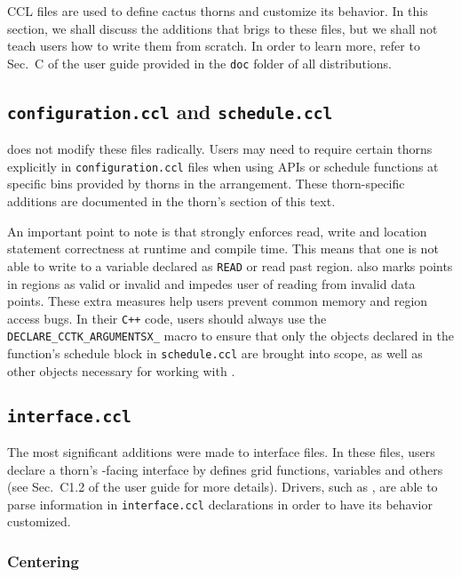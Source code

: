 CCL files are used to define cactus thorns and customize its behavior. In this section, we shall discuss the additions that \CarpetX\space brigs to these files, but we shall not teach users how to write them from scratch. In order to learn more, refer to Sec.~C of the \Cactus\space user guide provided in the \texttt{doc} folder of all distributions.

\subsection{\texttt{configuration.ccl} and \texttt{schedule.ccl}}

\CarpetX\space does not modify these files radically. Users may need to require certain thorns explicitly in \texttt{configuration.ccl} files when using \CarpetX\space APIs or schedule functions at specific bins provided by thorns in the \CarpetX\space arrangement. These thorn-specific additions are documented in the thorn's section of this text.

An important point to note is that \CarpetX\space strongly enforces read, write and location statement correctness at runtime and compile time. This means that one is not able to write to a variable declared as \texttt{READ} or read past region. \CarpetX\space also marks points in regions as valid or invalid and impedes user of reading from invalid data points. These extra measures help users prevent common memory and region access bugs. In their \texttt{C++} code, users should always use the \texttt{DECLARE\_CCTK\_ARGUMENTSX\_<scheduled function name>} macro to ensure that only the objects declared in the function's schedule block in \texttt{schedule.ccl} are brought into scope, as well as other objects necessary for working with \CarpetX.

\subsection{\texttt{interface.ccl}}

The most significant additions were made to interface files. In these files, users declare a thorn's \Cactus-facing interface by defines grid functions, variables and others (see Sec.~C1.2 of the \Cactus user guide for more details). Drivers, such as \CarpetX, are able to parse information in \texttt{interface.ccl} declarations in order to have its behavior customized. 

\subsubsection{Centering}

